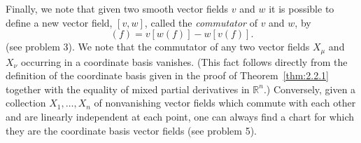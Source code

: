 Finally, we note that given two smooth vector fields \(v\) and \(w\) it is possible
to define a new vector field, \([v,w]\), called the \emph{commutator} of \(v\) and
\(w\), by
\begin{equation}
  [v,w](f)=v[w(f)]-w[v(f)] .
  \tag{2.2.14}\label{eq:2.2.14}
\end{equation}
(see problem 3).  We note that the commutator of any two vector fields \(X_\mu\)
and \(X_\nu\) occurring in a coordinate basis vanishes.  (This fact follows directly
from the definition of the coordinate basis given in the proof of
Theorem~\ref{thm:2.2.1} together with the equality of mixed partial derivatives in
\(\mathbb{R}^n\).)  Conversely, given a collection \(X_1,\ldots,X_n\) of
nonvanishing vector fields which commute with each other and are linearly
independent at each point, one can always find a chart for which they are the
coordinate basis vector fields (see problem 5).

